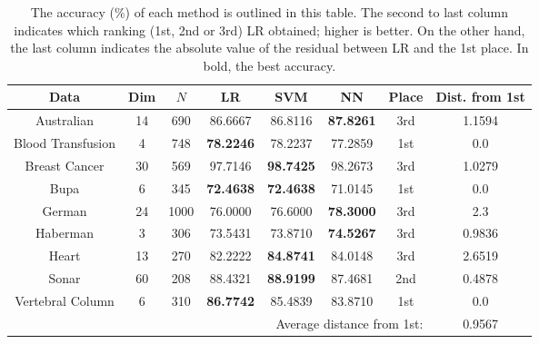\documentclass{INGUADY}
\begin{document}
\begin{body}
\begin{table*}
\center
\caption{The accuracy (\%) of each method is outlined in this table. The second to last column indicates which ranking (1st, 2nd or 3rd) LR obtained; higher is better. On the other hand, the last column indicates the absolute value of the residual between LR and the 1st place. In bold, the best accuracy.} \vspace{3mm}
\setlength{\tabcolsep}{2mm}
\begin{tabular}{c|cc|ccc|cc}
\toprule
Data & Dim & $N$ & LR & SVM & NN & Place & Dist. from 1st \\
\midrule
\midrule
Australian              & 14    & 690   & 86.6667                   & 86.8116                       & \textbf{87.8261}  & 3rd                   &  1.1594 \\
Blood Transfusion   & 4         & 748       & \textbf{78.2246}  & 78.2237                       & 77.2859                   & 1st                   & 0.0\\
Breast Cancer           & 30    & 569       & 97.7146                   & \textbf{98.7425}      & 98.2673                   & 3rd                   & 1.0279\\
Bupa                        & 6         & 345       & \textbf{72.4638}  & \textbf{72.4638 }     & 71.0145                   & 1st                   & 0.0\\
German                  & 24    & 1000  & 76.0000                   & 76.6000                       & \textbf{78.3000}  & 3rd                   & 2.3 \\
Haberman                & 3         & 306       & 73.5431                   & 73.8710                       & \textbf{74.5267}  & 3rd                   & 0.9836 \\
Heart                       & 13    & 270       & 82.2222                   & \textbf{84.8741}          & 84.0148                   & 3rd                   & 2.6519 \\
Sonar                       & 60    & 208       & 88.4321                   & \textbf{88.9199}      & 87.4681                   & 2nd                   & 0.4878\\
Vertebral Column    & 6         & 310       & \textbf{86.7742}  & 85.4839                       & 83.8710                   & 1st                   & 0.0 \\
\midrule
 & & & & \multicolumn{3}{r}{Average distance from 1st:}         & 0.9567 \\
\bottomrule
\end{tabular}
\label{tab:acc}
\end{table*}


\end{body}
\end{document}
